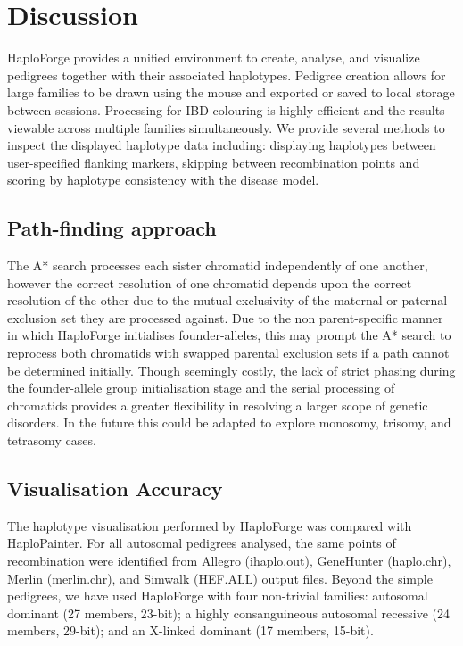 \documentclass{bioinfo}
\numberwithin{equation}{section}
\def\haplo{{HaploForge}}
\def\hpainter{{HaploPainter}}
\begin{document}
\pagebreak
\section{Discussion}

\haplo{} provides a unified environment to create, analyse, and visualize pedigrees together with their associated haplotypes. Pedigree creation allows for large families to be drawn using the mouse and exported or saved to local storage between sessions. Processing for IBD colouring is highly efficient and the results viewable across multiple families simultaneously. We provide several methods to inspect the displayed haplotype data including: displaying haplotypes between user-specified flanking markers, skipping between recombination points and scoring by haplotype consistency with the disease model.

\subsection{Path-finding approach}


The A* search processes each sister chromatid independently of one another, however the correct resolution of one chromatid depends upon the correct resolution of the other due to the mutual-exclusivity of the maternal or paternal exclusion set they are processed against. Due to the non parent-specific manner in which \haplo{} initialises founder-alleles, this may prompt the A* search to reprocess both chromatids with swapped parental exclusion sets if a path cannot be determined initially. 
Though seemingly costly, the lack of strict phasing during the founder-allele group initialisation stage and the serial processing of chromatids provides a greater flexibility in resolving a larger scope of genetic disorders. 
In the future this could be adapted to explore monosomy, trisomy, and tetrasomy cases.


\subsection{Visualisation Accuracy}

The haplotype visualisation performed by \haplo{} was compared with \hpainter{}. For all autosomal pedigrees analysed, the same points of recombination were identified from Allegro (ihaplo.out), GeneHunter (haplo.chr), Merlin (merlin.chr), and Simwalk (HEF.ALL) output files. Beyond the simple pedigrees, we have used \haplo{} with four non-trivial families: autosomal dominant (27 members, 23-bit); a highly consanguineous autosomal recessive (24 members, 29-bit); and an X-linked dominant (17 members, 15-bit).
\end{document}
